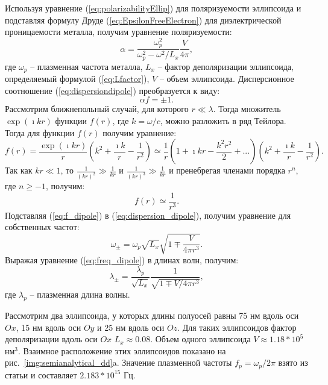 Используя уравнение (\ref{eq:polarizabilityEllip}) для поляризуемости эллипсоида и подставляя формулу Друде (\ref{eq:EpsilonFreeElectron}) для диэлектрической проницаемости металла, получим уравнение поляризуемости:
\begin{equation}
\alpha = \frac{\omega_p^2}{\omega_p^2 - \omega ^2 / L_x} \frac{V}{4 \pi},
\label{eq:polarizability_dipole}
\end{equation}
где $ \omega_p $ -- плазменная частота металла, $ L_x $ -- фактор деполяризации эллипсоида, определяемый формулой (\ref{eq:Lfactor}), $ V $ -- объем эллипсоида. Дисперсионное соотношение (\ref{eq:dispersiondipole}) преобразуется к виду:
\begin{equation}
\alpha f = \pm 1.
\label{eq:dispersion_dipole}
\end{equation}
Рассмотрим ближнепольный случай, для которого $ r \ll \lambda $. Тогда множитель $ \exp (\imath k r) $ функции $ f(r) $, где $ k = \omega / c $, можно разложить в ряд Тейлора. Тогда для функции $ f(r) $ получим уравнение:
\begin{equation}
f(r) = \frac{\exp (\imath k r)}{r} \left( k^2 + \frac{\imath k}{r} - \frac{1}{r^2} \right) \simeq \frac{1}{r} \left( 1 + \imath k r - \frac{k^2 r^2}{2} + ... \right) \left( k^2 + \frac{\imath k}{r} - \frac{1}{r^2} \right).
\label{eq:f_Taylor}
\end{equation}
Так как $ k r \ll 1 $, то $ \frac{1}{(kr)^2} \gg \frac{1}{kr} $ и $ \frac{1}{(kr)^3} \gg \frac{1}{kr} $ и пренебрегая членами порядка $ r^n $, где $ n \geq -1 $, получим:
\begin{equation}
f(r) \simeq \frac{1}{r^3}.
\label{eq:f_dipole}
\end{equation}
Подставляя (\ref{eq:f_dipole}) в (\ref{eq:dispersion_dipole}), получим уравнение для собственных частот:
\begin{equation}
\omega_{\pm} = \omega_p \sqrt{L_x} \sqrt{1 \mp \frac{V}{4 \pi r^3}}.
\label{eq:freq_dipole}
\end{equation}
Выражая уравнение (\ref{eq:freq_dipole}) в длинах волн, получим:
\begin{equation}
\lambda_{\pm} = \frac{\lambda_p}{\sqrt{L_x}} \frac{1}{\sqrt{1 \mp V / 4 \pi r^3}},
\label{eq:wl_dipole}
\end{equation}
где $ \lambda_p $ -- плазменная длина волны.

Рассмотрим два эллипсоида, у которых длины полуосей равны 75 нм вдоль оси $ Ox $,  15 нм вдоль оси $ Oy $ и 25 нм вдоль оси $ Oz $.  Для таких эллипсоидов фактор деполяризации вдоль оси $ Ox $ $ L_x \approx 0.08  $. Объем одного эллипсоида $ V \approx 1.18*10^5 $ нм$ ^3 $. Взаимное расположение этих 
эллипсоидов показано на рис.~\ref{img:semianalytical_dd}a. Значение плазменной частоты $ f_p = \omega_p / 2 \pi $ взято из статьи \cite{plasma_freq} и составляет $ 2.183*10^{15} $ Гц.

